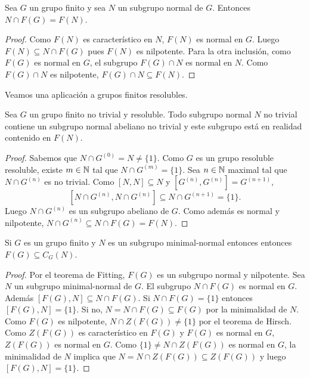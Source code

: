 \begin{corollary}
	\label{corollary:McapF(G)}
	Sea $G$ un grupo finito y sea $N$ un subgrupo normal de $G$. Entonces
	$N\cap F(G)=F(N)$.
\end{corollary}

\begin{proof}
	Como $F(N)$ es característico en $N$, $F(N)$ es normal en $G$. Luego
	$F(N)\subseteq N\cap F(G)$ pues $F(N)$ es nilpotente. 
	Para la otra inclusión, como
	$F(G)$ es normal en $G$, el subgrupo $F(G)\cap N$ es normal en $N$. Como $F(G)\cap N$
	es nilpotente, $F(G)\cap N\subseteq F(N)$. 
\end{proof}

Veamos una aplicación a grupos finitos resolubles. 

\begin{theorem}
	Sea $G$ un grupo finito no trivial y resoluble. Todo subgrupo normal $N$ no
	trivial contiene un subgrupo normal abeliano no trivial y este subgrupo está en realidad 
	contenido en $F(N)$. 
\end{theorem}

\begin{proof}
	Sabemos que $N\cap G^{(0)}=N\ne\{1\}$. Como $G$ es un grupo resoluble resoluble, 
	existe $m\in\mathbb{N}$ tal que $N\cap
	G^{(m)}=\{1\}$. Sea $n\in\mathbb{N}$ maximal tal que $N\cap G^{(n)}$ es no trivial. 
	Como $[N,N]\subseteq N$ y $[G^{(n)},G^{(n)}]=G^{(n+1)}$, 
	\[
	[N\cap G^{(n)},N\cap G^{(n)}]\subseteq N\cap G^{(n+1)}=\{1\}.
	\]
	Luego $N\cap G^{(n)}$ es un subgrupo abeliano de $G$. Como además es normal
	y nilpotente, $N\cap G^{(n)}\subseteq N\cap F(G)=F(N)$.
\end{proof}

\begin{theorem}
	\label{theorem:F(G)centraliza}
	Si $G$ es un grupo finito y $N$ es un subgrupo minimal-normal entonces
	entonces $F(G)\subseteq C_G(N)$.
\end{theorem}

\begin{proof}
	Por el teorema de Fitting, $F(G)$ es un subgrupo normal y nilpotente. 
	Sea $N$ un subgrupo minimal-normal de $G$. 
	El subgrupo $N\cap F(G)$
	es normal en $G$.  Además $[F(G),N]\subseteq N\cap F(G)$. Si $N\cap F(G)=\{1\}$ entonces
	$[F(G),N]=\{1\}$. Si no, $N=N\cap F(G)\subseteq F(G)$ por la minimalidad de $N$. Como
	$F(G)$ es nilpotente, $N\cap Z(F(G))\ne \{1\}$ por el
	teorema de Hirsch. 
	Como $Z(F(G))$ es característico en $F(G)$ y
	$F(G)$ es normal en $G$, $Z(F(G))$ es normal en $G$. Como $\{1\}\ne N\cap Z(F(G))$ es
	normal en $G$, la minimalidad de $N$ implica que $N=N\cap Z(F(G))\subseteq
	Z(F(G))$ y luego $[F(G),N]=\{1\}$. 
\end{proof}

